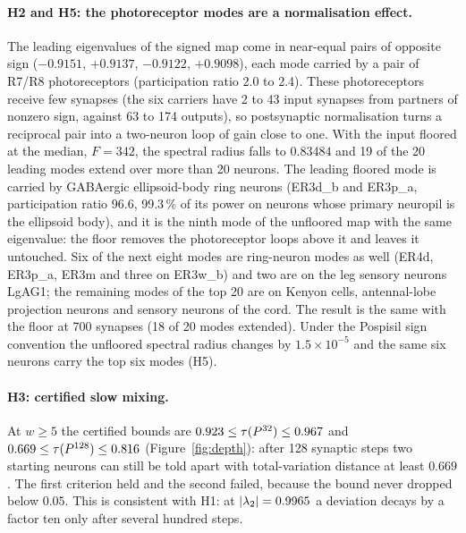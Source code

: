 \paragraph{H2 and H5: the photoreceptor modes are a normalisation effect.}
The leading eigenvalues of the signed map come in near-equal pairs of opposite sign
($-0.9151$, $+0.9137$, $-0.9122$, $+0.9098$), each mode carried by a pair of R7/R8 photoreceptors
(participation ratio 2.0 to 2.4). These photoreceptors receive few synapses (the six carriers have
2 to 43 input synapses from partners of nonzero sign, against 63 to 174 outputs), so postsynaptic
normalisation turns a reciprocal pair into a two-neuron loop of gain close to one. With the input floored at the
median, $F=342$, the spectral radius falls to $0.83484$ and 19 of the 20 leading modes extend over
more than 20 neurons. The leading floored mode is carried by GABAergic ellipsoid-body ring neurons
(ER3d\_b and ER3p\_a, participation ratio 96.6, 99.3\,\% of its power on neurons whose primary
neuropil is the ellipsoid body), and it is the ninth mode of the unfloored map with the same
eigenvalue: the floor removes the photoreceptor loops above it and leaves it untouched. Six of the
next eight modes are ring-neuron modes as well (ER4d, ER3p\_a, ER3m and three on ER3w\_b) and two
are on the leg sensory neurons LgAG1; the remaining modes of the top 20 are on Kenyon cells,
antennal-lobe projection neurons and sensory neurons of the cord. The result is the same with the floor at
700 synapses (18 of 20 modes extended). Under the Pospisil sign convention the unfloored spectral
radius changes by $1.5\times10^{-5}$ and the same six neurons carry the top six modes (H5).

\paragraph{H3: certified slow mixing.}
At $w\ge5$ the certified bounds are $0.923\le\tau(P^{32})\le0.967$ and
$0.669\le\tau(P^{128})\le0.816$ (Figure~\ref{fig:depth}): after 128 synaptic steps two starting
neurons can still be told apart with total-variation distance at least $0.669$. The first criterion held and the second failed,
because the bound never dropped below $0.05$. This is consistent with H1: at $\lvert\lambda_2\rvert=0.9965$ a
deviation decays by a factor ten only after several hundred steps.

